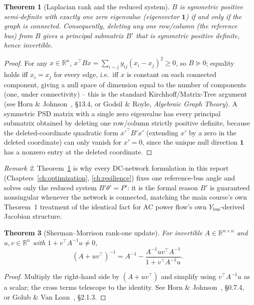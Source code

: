 \documentclass[11pt]{report}
\theoremstyle{plain}
\newtheorem{theorem}{Theorem}[chapter]
\theoremstyle{definition}
\theoremstyle{remark}
\newtheorem{remark}[theorem]{Remark}
\begin{document}
\begin{theorem}[Laplacian rank and the reduced system]
\label{thm:laplacian}
$B$ is symmetric positive semi-definite with exactly one zero
eigenvalue (eigenvector $\mathbf{1}$) if and only if the graph is
connected. Consequently, deleting any one row/column (the reference
bus) from $B$ gives a principal submatrix $B'$ that is symmetric
positive definite, hence invertible.
\end{theorem}
\begin{proof}
For any $x\in\mathbb{R}^n$, $x^\top Bx=\sum_{i\sim j}y_{ij}(x_i-x_j)^2\ge0$,
so $B\succeq0$; equality holds iff $x_i=x_j$ for every edge, i.e.\ iff
$x$ is constant on each connected component, giving a null space of
dimension equal to the number of components (one, under connectivity) --
this is the standard Kirchhoff/Matrix-Tree argument (see Horn \&
Johnson~\cite{hornjohnson}, \S13.4, or Godsil \& Royle, \emph{Algebraic
Graph Theory}). A symmetric PSD matrix with a single zero eigenvalue has
every principal submatrix obtained by deleting one row/column strictly
positive definite, because the deleted-coordinate quadratic form
$x'^\top B'x'$ (extending $x'$ by a zero in the deleted coordinate) can
only vanish for $x'=0$, since the unique null direction $\mathbf 1$ has a
nonzero entry at the deleted coordinate.
\end{proof}

\begin{remark}
Theorem~\ref{thm:laplacian} is why every DC-network formulation in this
report (Chapters~\ref{ch:optimization}, \ref{ch:resilience}) fixes one
reference-bus angle and solves only the reduced system $B'\theta'=P'$: it
is the formal reason $B'$ is guaranteed nonsingular whenever the network
is connected, matching the main course's own Theorem~1 treatment of the
identical fact for AC power flow's own $Y_{\text{bus}}$-derived
Jacobian structure.
\end{remark}

\begin{theorem}[Sherman--Morrison rank-one update]
\label{thm:sherman-morrison}
For invertible $A\in\mathbb{R}^{n\times n}$ and $u,v\in\mathbb{R}^n$
with $1+v^\top A^{-1}u\ne0$,
\begin{equation}
(A+uv^\top)^{-1} = A^{-1} - \frac{A^{-1}uv^\top A^{-1}}{1+v^\top A^{-1}u}.
\label{eq:sherman-morrison}
\end{equation}
\end{theorem}
\begin{proof}
Multiply the right-hand side by $(A+uv^\top)$ and simplify using
$v^\top A^{-1}u$ as a scalar; the cross terms telescope to the identity.
See Horn \& Johnson~\cite{hornjohnson}, \S0.7.4, or Golub \& Van
Loan~\cite{golubvanloan}, \S2.1.3.
\end{proof}
\end{document}
